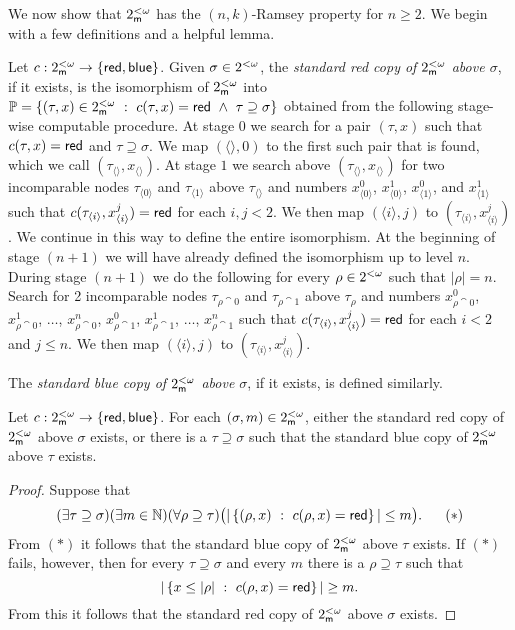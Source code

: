 We now show that $2^{<\omega}_{\mathsf{m}}$ has the $(n,k)$-Ramsey property for $n\geq 2$.
We begin with a few definitions and a helpful lemma.

Let $c:2^{<\omega}_{\mathsf{m}}\to\{\mathsf{red},\mathsf{blue}\}$.
Given $\sigma\in2^{<\omega}$, the \textit{standard red copy of $2^{<\omega}_{\mathsf{m}}$ above $\sigma$}, 
if it exists, is the isomorphism of $2^{<\omega}_{\mathsf{m}}$ into
$\Po=\set{(\tau,x)\in\binm}{c(\tau,x)=\red\ \land\ \tau\supseteq\sigma}$
obtained from the following stage-wise computable procedure.
At stage $0$ we search for a pair $(\tau,x)$ such that $c(\tau,x)=\mathsf{red}$ and
$\tau\supseteq\sigma$.
We map $(\langle\rangle,0)$ to the first such pair that is found,
which we call $(\tau_{\langle\rangle},x_{\langle\rangle})$.
At stage $1$ we search above $(\tau_{\langle\rangle},x_{\langle\rangle})$ for two incomparable nodes
$\tau_{\langle 0\rangle}$ and $\tau_{\langle 1\rangle}$ above $\tau_{\langle \rangle}$
and numbers $x^0_{\langle 0\rangle}$, $x^1_{\langle 0\rangle}$,
$x^0_{\langle 1\rangle}$, and $x^1_{\langle 1\rangle}$ such that
$c(\tau_{\langle i\rangle},x^j_{\langle i\rangle})=\mathsf{red}$ for each $i,j<2$.
We then map $(\langle i\rangle,j)$ to
$(\tau_{\langle i\rangle},x^j_{\langle i\rangle})$.
We continue in this way to define the entire isomorphism.
At the beginning of stage $(n+1)$ we will have already defined the
isomorphism up to level $n$.
During stage $(n+1)$ we do the following for every $\rho\in2^{<\omega}$
such that $|\rho|=n$.
Search for 2 incomparable nodes
$\tau_{\rho\cat 0}$ and $\tau_{\rho\cat 1}$ above $\tau_\rho$ and numbers
$x^0_{\rho\cat 0}$, $x^1_{\rho\cat 0}$, $\ldots$, $x^n_{\rho\cat 0}$,
$x^0_{\rho\cat 1}$, $x^1_{\rho\cat 1}$, $\ldots$, $x^n_{\rho\cat 1}$
such that
$c(\tau_{\langle i\rangle},x^j_{\langle i\rangle})=\mathsf{red}$ for each $i<2$ and $j\leq n$.
We then map $(\langle i\rangle,j)$ to
$(\tau_{\langle i\rangle},x^j_{\langle i\rangle})$.

The \textit{standard blue copy of $2^{<\omega}_{\mathsf{m}}$ above $\sigma$},
if it exists, is defined similarly.

\begin{lem}[\RCAo]\label{L:stndCpyBinm2}
Let $c:2^{<\omega}_{\mathsf{m}}\to\{\mathsf{red},\mathsf{blue}\}$.
For each $(\sigma,m)\in2^{<\omega}_{\mathsf{m}}$, either
the standard red copy of $2^{<\omega}_{\mathsf{m}}$ above $\sigma$ exists,
or there is a $\tau\supseteq\sigma$ such that
the standard blue copy of $2^{<\omega}_{\mathsf{m}}$ above $\tau$ exists.
\end{lem}
\begin{proof}
Suppose that
$$(\exists \tau\supseteq\sigma)(\exists m\in\NN)(\forall \rho\supseteq\tau)\big(|\set{(\rho,x)}{c(\rho,x)=\red}|\leq m\big).\ \ \ \ \ (*)$$
From $(*)$ it follows that the standard blue copy of $2^{<\omega}_{\mathsf{m}}$ above $\tau$ exists.
If $(*)$ fails, however, then for every $\tau\supseteq\sigma$ and every $m$ there is a
$\rho\supseteq\tau$ such that
$$|\left\{x\leq|\rho|\ :\ c(\rho,x)=\mathsf{red}\right\}|\geq m.$$
From this it follows that the standard red copy of $2^{<\omega}_{\mathsf{m}}$ above $\sigma$ exists.
\end{proof}

